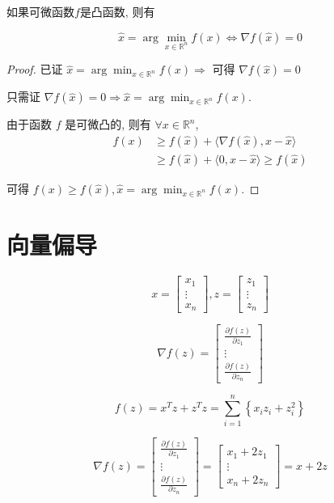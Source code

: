 \begin{theorem}
    如果可微函数$f$是凸函数, 则有

    $$ \hat{x}=\arg \min _{x \in \mathbb{R}^{n}} f(x) \Leftrightarrow \nabla f(\hat{x})=0 $$
\end{theorem}

\begin{proof}
    已证 $ \hat{x}=\arg \min _{x \in \mathbb{R}^{n}} f(x) \Rightarrow $ 可得 $ \nabla f(\hat{x})=0 $

    只需证 $ \nabla f(\hat{x})=0 \Rightarrow \hat{x}=\arg \min _{x \in \mathbb{R}^{n}} f(x) $.

    由于函数 $ f $ 是可微凸的, 则有 $ \forall x \in \mathbb{R}^{n} $,
$$
\begin{aligned}
f(x) & \geq f(\hat{x})+\langle\nabla f(\hat{x}), x-\hat{x}\rangle \\
& \geq f(\hat{x})+\langle 0, x-\hat{x}\rangle \geq f(\hat{x})
\end{aligned}
$$

可得 $ f(x) \geq f(\hat{x}), \hat{x}=\arg \min _{x \in \mathbb{R}^{n}} f(x) $.
\end{proof}

\section{向量偏导}

\begin{definition}[向量对向量的导数]
    \label{Definition:VectorVectorDerivative}
    $$ x=\left[\begin{array}{c}x_{1} \\ \vdots \\ x_{n}\end{array}\right], z=\left[\begin{array}{c}z_{1} \\ \vdots \\ z_{n}\end{array}\right] $$

    $$ \nabla f(z)=\left[\begin{array}{c}\frac{\partial f(z)}{\partial z_{1}} \\ \vdots \\ \frac{\partial f(z)}{\partial z_{n}}\end{array}\right] $$
\end{definition}

\begin{example}
    $$ f(z)=x^{T} z+z^{T} z=\sum_{i=1}^{n}\left\{x_{i} z_{i}+z_{i}^{2}\right\} $$

    $$ \nabla f(z)=\left[\begin{array}{c}\frac{\partial f(z)}{\partial z_{1}} \\ \vdots \\ \frac{\partial f(z)}{\partial z_{n}}\end{array}\right]=\left[\begin{array}{c}x_{1}+2 z_{1} \\ \vdots \\ x_{n}+2 z_{n}\end{array}\right]=x+2 z $$
\end{example}

